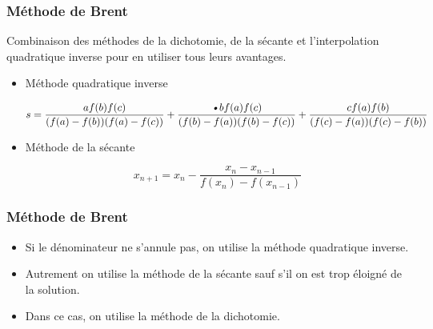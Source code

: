 \documentclass[french]{beamer}
\begin{document}

\begin{frame}
\frametitle{Méthode de Brent}

Combinaison des méthodes de la dichotomie, de la sécante et l'interpolation quadratique inverse pour en utiliser tous leurs avantages.

   \begin{itemize}
      \item Méthode quadratique inverse

      \begin{equation}
         s = \frac{af(b)f(c)}{(f(a)-f(b))(f(a)-f(c))} 
  + \frac{\textsl{•}bf(a)f(c)}{(f(b)-f(a))(f(b)-f(c))}
  + \frac{cf(a)f(b)}{(f(c)-f(a))(f(c)-f(b))}
     \end{equation}

     \item Méthode de la sécante

     \begin{equation}
        x_{n+1} = x_n - \frac{x_n - x_{n-1}}{f(x_n) - f(x_{n-1})}
     \end{equation}

   \end{itemize}
\end{frame}



\begin{frame}
\frametitle{Méthode de Brent}

   \begin{itemize}
      \item Si le dénominateur ne s'annule pas, on utilise la méthode quadratique inverse.
      \item Autrement on utilise la méthode de la sécante sauf s'il on est trop éloigné de la solution.
      \item Dans ce cas, on utilise la méthode de la dichotomie.
   \end{itemize}
\end{frame}


\end{document}
